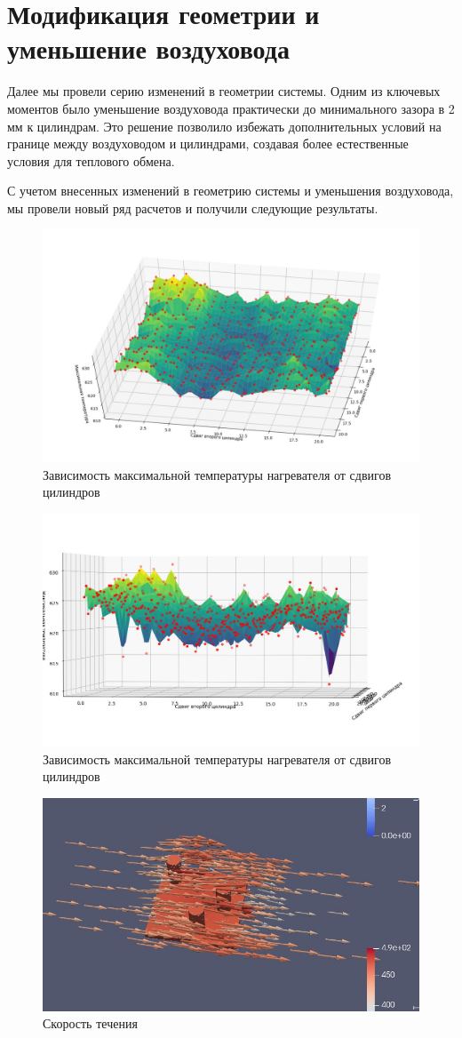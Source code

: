 \documentclass[a4paper,12pt]{article}
\theoremstyle{plain} %
\theoremstyle{definition} %
\theoremstyle{remark} %
\begin{document}
\section{Модификация геометрии и уменьшение воздуховода}

Далее мы провели серию изменений в геометрии системы. Одним из ключевых моментов было уменьшение воздуховода практически до минимального зазора в 2 мм к цилиндрам. Это решение позволило избежать дополнительных условий на границе между воздуховодом и цилиндрами, создавая более естественные условия для теплового обмена.

С учетом внесенных изменений в геометрию системы и уменьшения воздуховода, мы провели новый ряд расчетов и получили следующие результаты.

\begin{figure}[h]
	\begin{center}
		\includegraphics[width=0.4\linewidth]{22.1.jpg}
		\caption{Зависимость максимальной температуры нагревателя от сдвигов цилиндров} %
	\end{center}
\end{figure}
\begin{figure}[h]
	\begin{center}
		\includegraphics[width=0.4\linewidth]{22.2.jpg}
		\caption{Зависимость максимальной температуры нагревателя от сдвигов цилиндров} %
	\end{center}
\end{figure}
\begin{figure}[h]
	\begin{center}
		\includegraphics[width=0.4\linewidth]{22.3.jpg}
		\caption{Скорость течения} %
	\end{center}
\end{figure}
\end{document}
